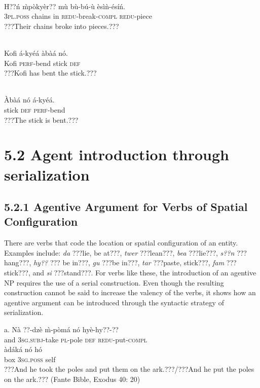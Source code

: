 \documentclass[output=paper]{langsci/langscibook}
\begin{document}
\ea\label{ex:}
\\
\gll H??ń  \`{m}pòkyèr??   m\`{u}  b\`{u}-bú-\`{u}     èsìǹ-ésíń.\\
     \textsc{3pl.poss}  chains    in  \textsc{redu}{}-break-\textsc{compl}  \textsc{redu}{}-piece\\
\glt ???Their chains broke into pieces.???
\z


\ea\label{ex:}
\\
\gll Kofi  á-kyéá    àbàá  nó.\\
     Kofi  \textsc{perf}{}-bend  stick  \textsc{def}\\
\glt ???Kofi has bent the stick.???
\z

\ea\label{ex:}
\\
\gll \`{A}bàá  nó  á-kyéá.\\
     stick  \textsc{def}  \textsc{perf}{}-bend\\
\glt ???The stick is bent.???
\z

\section{5.2  Agent introduction through serialization}
\subsection{5.2.1  Agentive Argument for Verbs of Spatial Configuration}

There are verbs that code the location or spatial configuration of an entity. Examples  include: \emph{da} ???lie, be at???, \emph{twer} ???lean???, \emph{bea} ???lie???, \emph{s??n} ???hang???, \emph{hy??} ??? be in???, \emph{gu} ???be in???, \emph{tar} ???paste, stick???, \emph{fam} ???stick???, and \emph{si} ???stand???. For verbs like these, the introduction of an agentive NP requires the use of a serial construction. Even though the resulting construction cannot be said to increase the valency of the verbs, it shows how an agentive argument can be introduced through the syntactic strategy of serialization.


\ea
\gll a.  Nà  ??{}-dzè     \`{m}-pòmá   nó  hyè-hy??-?? \\
             and  \textsc{3sg.subj}{}-take  \textsc{pl}{}-pole    \textsc{def}  \textsc{redu}{}-put-\textsc{compl}  \\
\gll   àdáká     nó    hó  \\
       box    \textsc{3sg.poss}  self  \\
\glt    ???And he took the poles and put them on the ark.???/???And he put the poles on the ark.??? (Fante Bible, Exodus 40: 20)
\z
\end{document}
